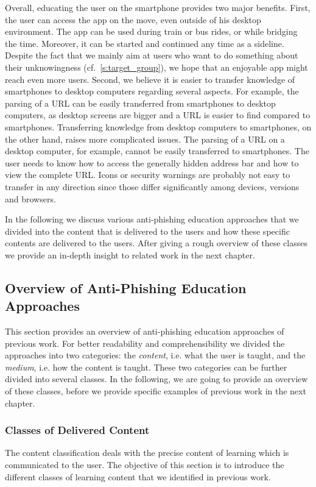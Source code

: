 Overall, educating the user on the smartphone provides two major benefits.
First, the user can access the app on the move, even outside of his desktop environment.
The app can be used during train or bus rides, or while bridging the time.
Moreover, it can be started and continued any time as a sideline.
Despite the fact that we mainly aim at users who want to do something about their unknowingness (cf.~\autoref{s:target_group}), we hope that an enjoyable app might reach even more users.
Second, we believe it is easier to transfer knowledge of smartphones to desktop computers regarding several aspects.
For example, the parsing of a URL can be easily transferred from smartphones to desktop computers, as desktop screens are bigger and a URL is easier to find compared to smartphones.
Transferring knowledge from desktop computers to smartphones, on the other hand, raises more complicated issues.
The parsing of a URL on a desktop computer, for example, cannot be easily transferred to smartphones.
The user needs to know how to access the generally hidden address bar and how to view the complete URL.
Icons or security warnings are probably not easy to transfer in any direction since those differ significantly among devices, versions and browsers.

In the following we discuss various anti-phishing education approaches that we divided into the content that is delivered to the users and how these specific contents are delivered to the users.
After giving a rough overview of these classes we provide an in-depth insight to related work in the next chapter.

\subsection{Overview of Anti-Phishing Education Approaches}
This section provides an overview of anti-phishing education approaches of previous work.
 For better readability and comprehensibility we divided the approaches into two categories: the \textit{content}, i.e.
 what the user is taught, and the 
\textit{medium}, i.e. how the content is taught.
These two categories can be further divided into several classes. 
In the following, we are going to provide an overview of these classes, before we provide specific examples of previous work in the next chapter.


\subsubsection{Classes of Delivered Content}
\label{s:content_classification}
The content classification deals with the precise content of learning which is communicated to the user. 
The objective of this section is to introduce the different classes of learning content that we identified in previous work.

